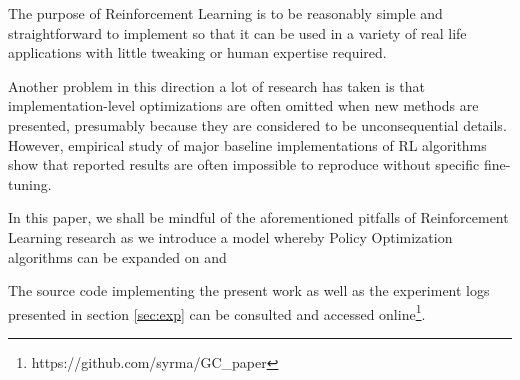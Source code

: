 The purpose of Reinforcement Learning is to be reasonably simple and straightforward to implement so that it can be used in a variety of real life applications with little tweaking or human expertise required.

Another problem in this direction a lot of research has taken is that implementation-level optimizations are often omitted when new methods are presented, presumably because they are considered to be unconsequential details. However, empirical study of  major baseline implementations of RL algorithms show that reported results are often impossible to reproduce without specific fine-tuning\cite{henderson2018deep}\cite{islam2017reproducibility}\cite{andrychowicz2021matters}\cite{dossa2021empirical}.


In this paper, we shall be mindful of the aforementioned pitfalls of Reinforcement Learning research as we introduce a model whereby Policy Optimization algorithms can be expanded on and 

The source code implementing the present work as well as the experiment logs presented in section \ref{sec:exp} can be consulted and accessed online\footnote{https://github.com/syrma/GC\_paper}.
